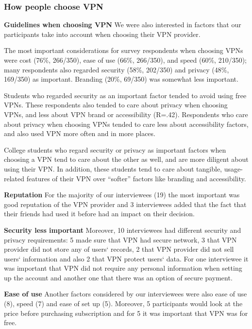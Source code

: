 \subsubsection{How people choose VPN} \label{sec:findings-choosing}
\textbf{Guidelines when choosing VPN} We were also interested in factors that
our participants take into account when choosing their VPN provider.

The most important considerations for survey respondents when choosing VPNs
were cost (76\%, 266/350), ease of use (66\%, 266/350), and speed (60\%,
210/350); many respondents also regarded security (58\%, 202/350) and privacy
(48\%, 169/350) as important. Branding (20\%, 69/350) was somewhat less
important.

Students who regarded security as an important factor tended to avoid using
free VPNs. These respondents also tended to care about privacy when choosing
VPNs, and less about VPN brand or accessibility (R=.42). Respondents who care
about privacy when choosing VPNs tended to care less about accessibility
factors, and also used VPN more often and in more places.

College students who regard security or privacy as important factors when
choosing a VPN tend to care about the other as well, and are more diligent
about using their VPN. In addition, these students tend to care about
tangible, usage-related features of their VPN over “softer” factors like
branding and accessibility.


\textbf{Reputation} For the majority of our interviewees (19) the most
important was good reputation of the VPN provider and 3 interviewees added
that the fact that their friends had used it before had an impact on their
decision. 

\textbf{Security less important} Moreover, 10 interviewees had different
security and privacy requirements: 5 made sure that VPN had secure network, 3
that VPN provider did not store any of users‘ records, 2 that VPN provider did
not sell users‘ information and also 2 that VPN protect users‘ data. For one
interviewee it was important that VPN did not require any personal information
when setting up the account and another one that there was an option of secure
payment. 

\textbf{Ease of use} Another factors considered by our interviewees were also
ease of use (8), speed (7) and ease of set up (5). Moreover, 5 participants
would look at the price before purchasing subscription and for 5 it was
important that VPN was for free.   

